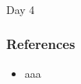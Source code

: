 \begin{frame}[fragile]\frametitle{}
\begin{center}
{\Large Day 4}
\end{center}
\end{frame}

\begin{frame}[fragile]\frametitle{References}
  \begin{itemize}
    \item aaa
  \end{itemize}

\end{frame}